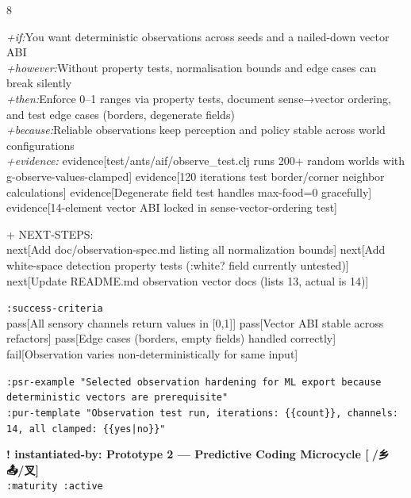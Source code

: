 \documentclass[landscape]{article}
\newcommand{\flexitag}[1]{\textcolor[gray]{0.35}{\textit{#1}}}
\newenvironment{devmapactive}{%
  \def\FrameCommand{\colorbox{devmapactivebg}}%
  \setlength{\fboxsep}{2pt}%
  \MakeFramed{\advance\hsize-\width \FrameRestore}%
}{\endMakeFramed}
\begin{document}
\begin{paracol}{8}
\begin{devmapactive}
  \flexitag{+if:}You want deterministic observations across seeds and a nailed-down vector ABI\\
  \flexitag{+however:}Without property tests, normalisation bounds and edge cases can break silently\\
  \flexitag{+then:}Enforce 0–1 ranges via property tests, document sense→vector ordering, and test edge cases (borders, degenerate fields)\\
  \flexitag{+because:}Reliable observations keep perception and policy stable across world configurations\\
  \flexitag{+evidence:} evidence[test/ants/aif/observe\_test.clj runs 200+ random worlds with g-observe-values-clamped] evidence[120 iterations test border/corner neighbor calculations] evidence[Degenerate field test handles max-food=0 gracefully] evidence[14-element vector ABI locked in sense-vector-ordering test]\\
\par
  + NEXT-STEPS:\\
    next[Add doc/observation-spec.md listing all normalization bounds] next[Add white-space detection property tests (:white? field currently untested)] next[Update README.md observation vector docs (lists 13, actual is 14)]\\
\par
  \texttt{:\allowbreak{}success-\allowbreak{}criteria}\\
    pass[All sensory channels return values in [0,1]] pass[Vector ABI stable across refactors] pass[Edge cases (borders, empty fields) handled correctly] fail[Observation varies non-deterministically for same input]\\
\par
  \texttt{:\allowbreak{}psr-\allowbreak{}example "Selected observation hardening for ML export because deterministic vectors are prerequisite"}\\
  \texttt{:\allowbreak{}pur-\allowbreak{}template "Observation test run,\allowbreak{} iterations:\allowbreak{} \{\{count\}\},\allowbreak{} channels:\allowbreak{} 14,\allowbreak{} all clamped:\allowbreak{} \{\{yes|\allowbreak{}no\}\}"}\\
\par
\par
\end{devmapactive}
\begin{devmapactive}
\textbf{! instantiated-by: Prototype 2 — Predictive Coding Microcycle [🙇/乡 📤/叉]}\\
  \texttt{:\allowbreak{}maturity :\allowbreak{}active}\\

\end{devmapactive}
\end{paracol}
\end{document}
